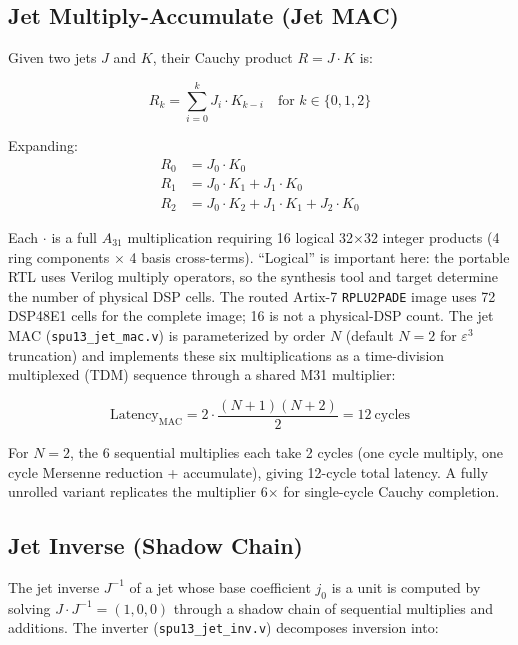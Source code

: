 \documentclass[conference]{IEEEtran}
\begin{document}
\subsection{Jet Multiply-Accumulate (Jet MAC)}

Given two jets $J$ and $K$, their Cauchy product $R = J \cdot K$ is:

\begin{equation}
R_k = \sum_{i=0}^{k} J_i \cdot K_{k-i} \quad\text{for } k \in \{0, 1, 2\}
\end{equation}

Expanding:
\begin{align}
R_0 &= J_0 \cdot K_0 \\
R_1 &= J_0 \cdot K_1 + J_1 \cdot K_0 \\
R_2 &= J_0 \cdot K_2 + J_1 \cdot K_1 + J_2 \cdot K_0
\end{align}

	Each $\cdot$ is a full $A_{31}$ multiplication requiring 16
logical 32$\times$32 integer products (4 ring components $\times$ 4 basis
cross-terms). ``Logical'' is important here: the portable RTL uses Verilog
multiply operators, so the synthesis tool and target determine the number of
physical DSP cells. The routed Artix-7 \texttt{RPLU2PADE} image uses 72
DSP48E1 cells for the complete image; 16 is not a physical-DSP count. The jet
MAC (\texttt{spu13\_jet\_mac.v}) is parameterized by
order $N$ (default $N=2$ for $\varepsilon^3$ truncation) and implements
these six multiplications as a time-division multiplexed (TDM) sequence
through a shared M31 multiplier:

\begin{equation}
\text{Latency}_{\text{MAC}} = 2 \cdot \frac{(N+1)(N+2)}{2} = 12\ \text{cycles}
\end{equation}

For $N=2$, the 6 sequential multiplies each take 2 cycles (one cycle
multiply, one cycle Mersenne reduction + accumulate), giving 12-cycle total
latency. A fully unrolled variant replicates the multiplier 6$\times$ for
single-cycle Cauchy completion.

\subsection{Jet Inverse (Shadow Chain)}

	The jet inverse $J^{-1}$ of a jet whose base coefficient $j_0$ is a unit is computed
by solving $J \cdot J^{-1} = (1, 0, 0)$ through a shadow chain of
sequential multiplies and additions. The inverter
(\texttt{spu13\_jet\_inv.v}) decomposes inversion into:
\end{document}
